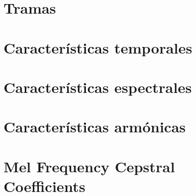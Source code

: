 \section{Tramas}\label{sec:frames}


\section{Características temporales}\label{sec:característicasTemporales}


\section{Características espectrales}\label{sec:característicasEspectrales}


\section{Características armónicas}\label{sec:característicasArmónicas}


\section{Mel Frequency Cepstral Coefficients}\label{sec:MFCC}



